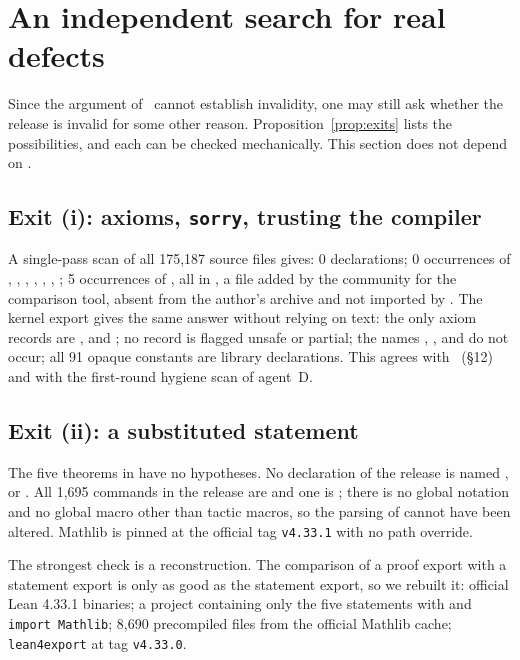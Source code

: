 \section{An independent search for real defects}
\label{sec:defects}

Since the argument of \N\ cannot establish invalidity, one may still ask whether the release is invalid for some other reason.
Proposition~\ref{prop:exits} lists the possibilities, and each can be checked mechanically. This section does not depend on \N.

\subsection{Exit (i): axioms, \texttt{sorry}, trusting the compiler}

A single-pass scan of all 175,187 source files gives: 0  declarations; 0 occurrences of , , , , , , ;
5 occurrences of , all in , a file added by the community for the comparison tool, absent from the author's archive and not imported by .
The kernel export gives the same answer without relying on text: the only axiom records are ,  and ; no record is flagged unsafe or partial;
the names , ,  and  do not occur; all 91 opaque constants are library declarations.
This agrees with \N\ (\S12) and with the first-round hygiene scan of agent~D.

\subsection{Exit (ii): a substituted statement}
\label{sec:rebuild}

The five theorems in  have no hypotheses. No declaration of the release is named ,  or .
All 1,695  commands in the release are  and one is ; there is no global notation and no global macro other than tactic macros, so the parsing of  cannot have been altered.
Mathlib is pinned at the official tag \texttt{v4.33.1} with no path override.

The strongest check is a reconstruction. The comparison of a proof export with a statement export is only as good as the statement export, so we rebuilt it:
official Lean 4.33.1 binaries; a project containing only the five statements with  and \texttt{import Mathlib}; 8,690 precompiled files from the official Mathlib cache; \texttt{lean4export} at tag \texttt{v4.33.0}.

